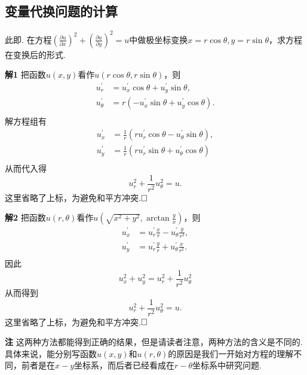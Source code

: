 \documentclass{ctexart}
\newenvironment{custom}[1]{\par\noindent \textbf{#1}\quad}{\par\vspace{1em}}
\begin{document}
\subsection{变量代换问题的计算}
\begin{example}
此即\cite[例题20.3.1]{XHM}. 在方程$(\frac{\partial u}{\partial x})^{2}+(\frac{\partial u}{\partial y})^{2}=u$中做极坐标变换$x=r\cos{\theta},y=r\sin{\theta}$，求方程在变换后的形式.
\end{example}

\begin{custom}{解1}
把函数$u(x,y)$看作$u(r\cos{\theta},r\sin{\theta})$，则
$$\begin{aligned}u^{\prime}_{r}&=u^{\prime}_{x}\cos{\theta}+u^{\prime}_{y}\sin{\theta},\\
u^{\prime}_{\theta}&=r(-u^{\prime}_{x}\sin{\theta}+u^{\prime}_{y}\cos{\theta}).\\\end{aligned}$$
解方程组有
$$\begin{aligned}u^{\prime}_{x}&=\frac{1}{r}(ru^{\prime}_{r}\cos{\theta}-u^{\prime}_{\theta}\sin{\theta}),\\
u^{\prime}_{y}&=\frac{1}{r}(ru^{\prime}_{r}\sin{\theta}+u^{\prime}_{\theta}\cos{\theta})\\\end{aligned}$$
从而代入得
$$u_{r}^{2}+\frac{1}{r^{2}}u_{\theta}^{2}=u.$$
这里省略了上标，为避免和平方冲突.$\hfill{\square}$
\end{custom}

\begin{custom}{解2}
把函数$u(r,\theta)$看作$u(\sqrt{x^{2}+y^{2}},\arctan{\frac{y}{x}})$，则
$$\begin{aligned}u^{\prime}_{x}&=u^{\prime}_{r}\frac{x}{r}-u^{\prime}_{\theta}\frac{y}{r^{2}},\\ u^{\prime}_{y}&=u^{\prime}_{r}\frac{y}{r}+u^{\prime}_{\theta}\frac{x}{r^{2}}.\\\end{aligned}$$
因此
$$u_{x}^{2}+u_{y}^{2}=u_{r}^{2}+\frac{1}{r^{2}}u_{\theta}^{2}$$
从而得到
$$u_{r}^{2}+\frac{1}{r^{2}}u_{\theta}^{2}=u.$$
这里省略了上标，为避免和平方冲突.$\hfill{\square}$
\end{custom}

\begin{custom}{注}
这两种方法都能得到正确的结果，但是请读者注意，两种方法的含义是不同的. 具体来说，能分别写函数$u(x,y)$和$u(r,\theta)$的原因是我们一开始对方程的理解不同，前者是在$x-y$坐标系，而后者已经看成在$r-\theta$坐标系中研究问题.
\end{custom}
\end{document}
